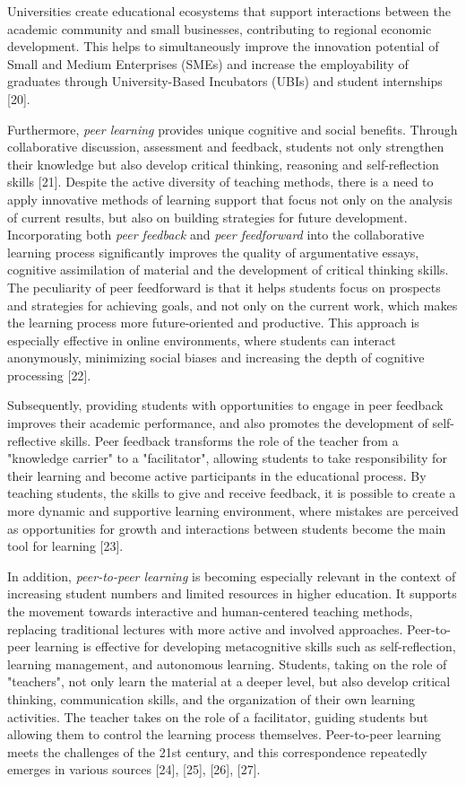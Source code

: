 \begin{multicols}{2}
Universities create educational ecosystems that support interactions
between the academic community and small businesses, contributing to
regional economic development. This helps to simultaneously improve the
innovation potential of Small and Medium Enterprises (SMEs) and increase
the employability of graduates through University-Based Incubators
(UBIs) and student internships {[}20{]}.

Furthermore, \emph{peer learning} provides unique cognitive and social
benefits. Through collaborative discussion, assessment and feedback,
students not only strengthen their knowledge but also develop critical
thinking, reasoning and self-reflection skills {[}21{]}. Despite the
active diversity of teaching methods, there is a need to apply
innovative methods of learning support that focus not only on the
analysis of current results, but also on building strategies for future
development. Incorporating both \emph{peer feedback} and \emph{peer
feedforward} into the collaborative learning process significantly
improves the quality of argumentative essays, cognitive assimilation of
material and the development of critical thinking skills. The
peculiarity of peer feedforward is that it helps students focus on
prospects and strategies for achieving goals, and not only on the
current work, which makes the learning process more future-oriented and
productive. This approach is especially effective in online
environments, where students can interact anonymously, minimizing social
biases and increasing the depth of cognitive processing {[}22{]}.

Subsequently, providing students with opportunities to engage in peer
feedback improves their academic performance, and also promotes the
development of self-reflective skills. Peer feedback transforms the role
of the teacher from a "knowledge carrier" to a "facilitator", allowing
students to take responsibility for their learning and become active
participants in the educational process. By teaching students, the
skills to give and receive feedback, it is possible to create a more
dynamic and supportive learning environment, where mistakes are
perceived as opportunities for growth and interactions between students
become the main tool for learning {[}23{]}.

In addition, \emph{peer-to-peer learning} is becoming especially
relevant in the context of increasing student numbers and limited
resources in higher education. It supports the movement towards
interactive and human-centered teaching methods, replacing traditional
lectures with more active and involved approaches. Peer-to-peer learning
is effective for developing metacognitive skills such as
self-reflection, learning management, and autonomous learning. Students,
taking on the role of "teachers", not only learn the material at a
deeper level, but also develop critical thinking, communication skills,
and the organization of their own learning activities. The teacher takes
on the role of a facilitator, guiding students but allowing them to
control the learning process themselves. Peer-to-peer learning meets the
challenges of the 21st century, and this correspondence repeatedly
emerges in various sources {[}24{]}, {[}25{]}, {[}26{]}, {[}27{]}.


\end{multicols}
